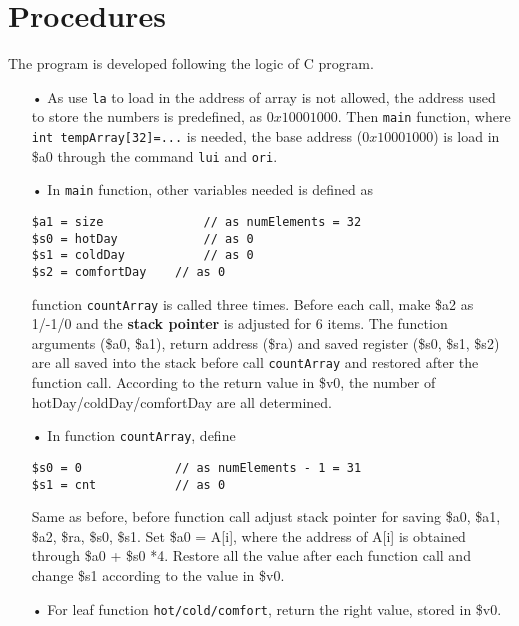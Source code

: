 \documentclass[a4paper]{article}
\begin{document}
	\section{Procedures}
The program is developed following the logic of C program. 
\begin{enumerate}
\item[•] As use \texttt{la} to load in the address of array is not allowed, the address used to store the numbers is predefined, as $0x10001000$. Then \texttt{main} function, where \texttt{int tempArray[32]=...} is needed, the base address ($0x10001000$) is load in \$a0 through the command \texttt{lui} and \texttt{ori}.
\item[•] In \texttt{main} function, other variables needed is defined as 



\begin{verbatim}
$a1 = size				// as numElements = 32 
$s0 = hotDay 			// as 0
$s1 = coldDay 			// as 0
$s2 = comfortDay 	// as 0
 \end{verbatim}
function \texttt{countArray} is called three times. Before each call, make 
\$a2 as 1/-1/0 and the \textbf{stack pointer} is adjusted for 6 items. The function arguments (\$a0, \$a1), return address (\$ra) and saved register (\$s0, \$s1, \$s2) are all saved into the stack before call \texttt{countArray} and restored after the function call. According to the return value in \$v0, the number of hotDay/coldDay/comfortDay are all determined.
\item[•] In function \texttt{countArray}, define 
\begin{verbatim}
$s0 = 0				// as numElements - 1 = 31 
$s1 = cnt 			// as 0
 \end{verbatim}
 Same as before, before function call adjust stack pointer for saving \$a0, \$a1, \$a2, \$ra, \$s0, \$s1. Set \$a0 = A[i], where the address of A[i] is obtained through \$a0 + \$s0 *4. 
 Restore all the value after each function call and change \$s1 according to the value in \$v0.
 \item[•] For leaf function \texttt{hot/cold/comfort}, return the right value, stored in \$v0. 
\end{enumerate}	
	
		
\end{document}
